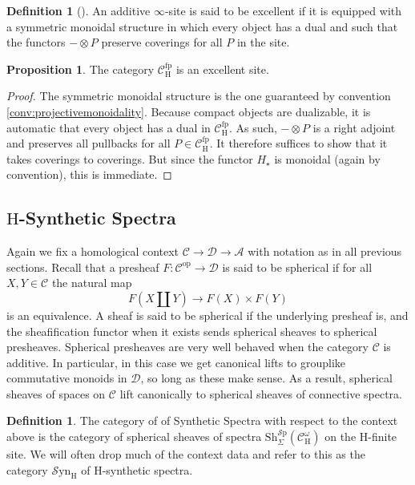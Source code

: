 \documentclass[10pt]{amsart}
\theoremstyle{definition}
\numberwithin{figure}{section}
\numberwithin{equation}{section}
\newtheorem{proposition}[figure]{Proposition}
\newtheorem{definition}[figure]{Definition}
\newcommand{\op}{\mathrm{op}}
\newcommand{\cA}{\mathcal{A}}
\newcommand{\cC}{\mathcal{C}}
\newcommand{\cD}{\mathcal{D}}
\theoremstyle{cited}
\newcommand{\Sp}{{\mathcal{S}\mathrm{p}}}
\newcommand{\Sh}{\mathrm{Sh}}
\newcommand{\fp}{\mathrm{fp}}
\newcommand{\Syn}{\mathcal{S}\mathrm{yn}}
\renewcommand{\H}{\mathrm{H}}
\begin{document}
\begin{definition}[\cite{Pst22}]
  An additive $\infty$-site is said to be excellent if it is equipped with a symmetric monoidal structure in which every object has a dual and such that the functors $-\otimes P$ preserve coverings for all $P$ in the site.
\end{definition}

\begin{proposition}
  The category $\cC^\fp_\H$ is an excellent site.
\end{proposition}

\begin{proof}
  The symmetric monoidal structure is the one guaranteed by convention \ref{conv:projectivemonoidality}. Because compact objects are dualizable, it is automatic that every object has a dual in $\cC^\fp_\H$. As such, $-\otimes P$ is a right adjoint and preserves all pullbacks for all $P\in \cC^\fp_\H$. It therefore suffices to show that it takes coverings to coverings. But since the functor $H_\star$ is monoidal (again by convention), this is immediate.
\end{proof}

\subsection{$\H$-Synthetic Spectra}

Again we fix a homological context $\cC\to \cD\to \cA$ with notation as in all previous sections. Recall that a presheaf $F:\cC^\op\to \cD$ is said to be spherical if for all $X,Y\in \cC$ the natural map
\[
F(X\amalg Y)\to F(X)\times F(Y)
\]
is an equivalence. A sheaf is said to be spherical if the underlying presheaf is, and the sheafification functor when it exists sends spherical sheaves to spherical presheaves. Spherical presheaves are very well behaved when the category $\cC$ is additive. In particular, in this case we get canonical lifts to grouplike commutative monoids in $\cD$, so long as these make sense. As a result, spherical sheaves of spaces on $\cC$ lift canonically to spherical sheaves of connective spectra.

\begin{definition}\label{def:synsp}
  The category of of Synthetic Spectra with respect to the context above is the category of spherical sheaves of spectra $\Sh^\Sp_\Sigma(\cC^\omega_\H)$ on the $\H$-finite site. We will often drop much of the context data and refer to this as the category $\Syn_\H$ of $\H$-synthetic spectra.
\end{definition}
\end{document}
